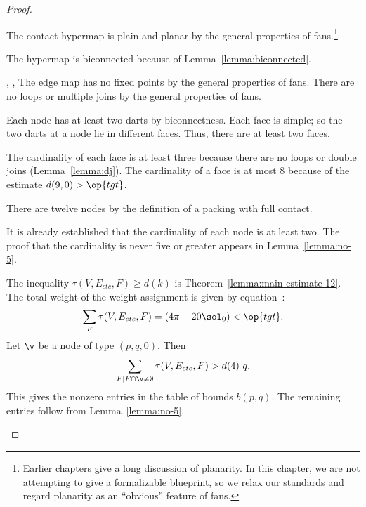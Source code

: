 \begin{proof}
\begin{description}
\item {} The contact hypermap is plain and planar by the
  general properties of fans.\footnote{Earlier chapters give a long discussion of planarity.
In this chapter, we are not attempting to give a formalizable blueprint, so we relax
our standards and regard
planarity as an ``obvious'' feature of fans.}
\item {} The hypermap is biconnected because of
  Lemma~\ref{lemma:biconnected}.
\item {}, ,  The
  edge map has no fixed points by the general properties of fans.
  There are no loops or multiple joins by the general properties of
  fans.
\item {} Each node has at least two darts by
  biconnectness. Each face is simple; so the two darts at a node lie
  in different faces.  Thus, there are at least two faces.
\item {} The cardinality of each face is at least three
  because there are no loops or double joins (Lemma~\ref{lemma:dj}).  The cardinality of a
  face is at most $8$ because of the estimate $d(9,0)>\op{tgt}$.
\item {} There are twelve nodes by the definition of a
  packing with full contact.
\item {} It is already established that the cardinality
  of each node is at least two.  The proof that the cardinality is
  never five or greater appears in Lemma~\ref{lemma:no-5}.
\item {} The inequality $\tau(V,E_{ctc},F)\ge d(k)$ is
  Theorem~\ref{lemma:main-estimate-12}.
  The total weight of the weight assignment is given by
  equation~:
\begin{displaymath}
  \sum_F \tau(V,E_{ctc},F) = (4\pi - 20\sol_0) < \op{tgt}.
\end{displaymath}
%
Let $\v$ be a node of type $(p,q,0)$.  
Then
\begin{displaymath}
\sum_{F\mid F\cap \v\ne\emptyset}\tau(V,E_{ctc},F) > d(4)~q.
\end{displaymath}
This gives the nonzero entries in the table of bounds $b(p,q)$.  The
remaining entries follow from Lemma~\ref{lemma:no-5}.
\end{description}
\end{proof}





